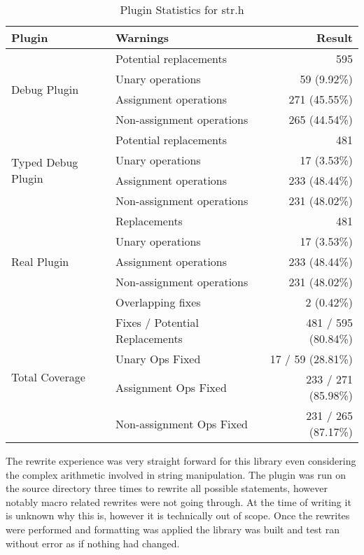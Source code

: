 \begin{table}[ht]
\centering
\caption{Plugin Statistics for str.h}
\label{tab:str.h}
\begin{tabular}{@{}llr@{}}
\toprule
\textbf{Plugin} & \textbf{Warnings} & \textbf{Result} \\
\midrule

\multirow{4}{*}{Debug Plugin} 
  & Potential replacements & 595 \\
  & Unary operations        & 59 (9.92\%) \\
  & Assignment operations   & 271 (45.55\%) \\
  & Non-assignment operations & 265 (44.54\%) \\
\midrule

\multirow{4}{*}{Typed Debug Plugin} 
  & Potential replacements & 481 \\
  & Unary operations        & 17 (3.53\%) \\
  & Assignment operations   & 233 (48.44\%) \\
  & Non-assignment operations & 231 (48.02\%) \\
\midrule

\multirow{5}{*}{Real Plugin} 
  & Replacements            & 481 \\
  & Unary operations        & 17 (3.53\%) \\
  & Assignment operations   & 233 (48.44\%) \\
  & Non-assignment operations & 231 (48.02\%) \\
  & Overlapping fixes       & 2 (0.42\%) \\
\midrule
\midrule
\multirow{4}{*}{Total Coverage} 
  & Fixes / Potential Replacements & 481 / 595 (80.84\%) \\
  & Unary Ops Fixed                & 17 / 59 (28.81\%) \\
  & Assignment Ops Fixed           & 233 / 271 (85.98\%) \\
  & Non-assignment Ops Fixed       & 231 / 265 (87.17\%) \\
\bottomrule
\end{tabular}
\end{table}

The rewrite experience was very straight forward for this library even considering the complex arithmetic involved in string manipulation. The plugin was run on the source directory three times to rewrite all possible statements, however notably macro related rewrites were not going through. At the time of writing it is unknown why this is, however it is technically out of scope. Once the rewrites were performed and formatting was applied the library was built and test ran without error as if nothing had changed.

